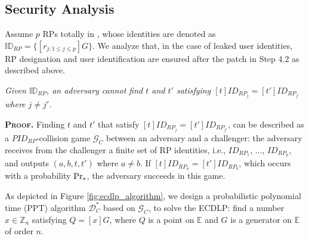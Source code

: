 \subsection{Security Analysis}
\label{proof-rp-collision}

Assume $p$ RPs totally in \usso,
    whose identities are denoted as $\mathbb{ID}_{RP} = \{[r_{j; 1 \leq j \leq p}]G\}$.
We analyze that, in the case of leaked user identities,
    RP designation and user identification are ensured after the patch in Step 4.2 as described above.

\vspace{-1mm}
\begin{lemma}
\emph{Given $\mathbb{ID}_{RP}$, an adversary cannot find $t$ and $t'$ satisfying $[t]ID_{RP_j} = [t']ID_{RP_{j'}}$ where $j \neq j'$.}\label{thm-rp-collision}
\end{lemma}
\vspace{-1mm}

\noindent\textbf{\textsc{Proof.}} 
Finding $t$ and $t'$ that satisfy $[t]ID_{RP_j} = [t']ID_{RP_{j'}}$, can be described as a $PID_{RP}$-collision game $\mathcal{G}_C$ between an adversary and a challenger: the adversary receives from the challenger a finite set of RP identities, i.e., $ID_{RP_1}$, ..., $ID_{RP_p}$, and outputs $(a, b, t, t')$ where $a \neq b$. If $[t]ID_{RP_a}=[t']ID_{RP_b}$, which occurs with a probability ${\rm Pr}_s$, the adversary succeeds in this game.

As depicted in Figure \ref{fig:ecdlp_algorithm}, we design a probabilistic polynomial time (PPT) algorithm $\mathcal{D}^*_C$ based on $\mathcal{G}_C$, to solve the ECDLP: find a number $x \in \mathbb{Z}_n$ satisfying $Q = [x]G$, where $Q$ is a point on $\mathbb{E}$ and $G$ is a generator on $\mathbb{E}$ of order $n$.

